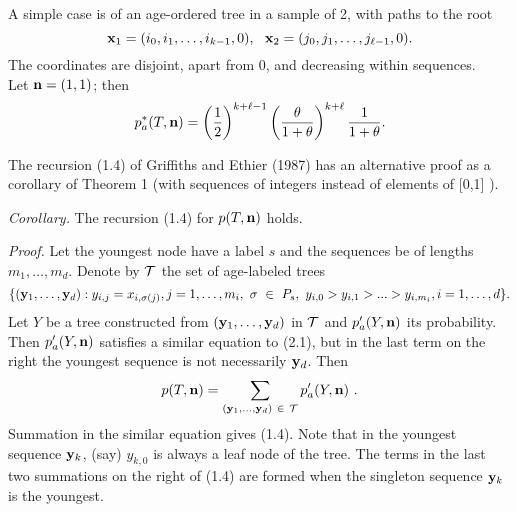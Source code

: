     A simple case is of an age-ordered tree in a sample of 2, with paths
to the root 
        $${\bf x}_1 = (i_0,i_1, \ldots ,i_{k - 1},0),~~
        {\bf  x}_2 = (j_0,j_1, \ldots ,j_{\ell - 1},0).$$
The coordinates are disjoint, apart from 0, and decreasing within
sequences.\\
Let ${\bf  n} = (1,1)$; then
    $$p^*_a(T,{\bf  n}) = \left (\frac{1}{2}\right )^{k + \ell - 1}
\left (\frac{ \theta }{1 + \theta}\right )^{k + \ell}\frac{1}{1 + \theta}.$$


    The recursion (1.4) of Griffiths and Ethier (1987) has an alternative 
proof as a corollary of Theorem 1 (with sequences of integers instead
of elements of [0,1] ).
\vspace{0.5cm}

{\em  Corollary.}
  The recursion (1.4) for $p(T,{\bf  n})$ holds.
\vspace{0.5cm}

{\em  Proof.}
       Let the youngest node have a label $s$ and the sequences be of lengths
$m_1 , \ldots , m_d$. Denote by ${\cal T}$ the set of age-labeled trees
$$\{({\bf y}_1, \ldots , {\bf y}_d) : y_{i,j} = x_{i, \sigma (j)},
j = 1, \ldots ,m_i,~\sigma~\in~P_s,~y_{i,0} > y_{i,1} > ... > y_{i,m_i},
i = 1, \ldots ,d \}.$$
Let $Y$ be a tree constructed from 
$({\bf y}_1, \ldots ,{\bf y}_d)$ in ${\cal T}$
and $p'_a(Y,{\bf  n})$ its probability.
Then $p'_a(Y,{\bf  n})$ satisfies a similar equation to (2.1), but in the last
term on the right the youngest sequence is not necessarily ${\bf  y}_d$.
Then
    $$p(T,{\bf  n}) = \sum_{({\bf y}_1, \ldots ,{\bf y}_d)~\in~{\cal T}}
        p'_a(Y,{\bf  n})~.$$
Summation in the similar equation gives (1.4). Note that in the youngest
sequence ${\bf y}_k$, (say) $y_{k,0}$ is always a leaf node of the tree.
The terms in the last two summations on the right of (1.4) are formed 
when the singleton sequence ${\bf  y}_k$ is the youngest.
\vspace{0.5cm}

